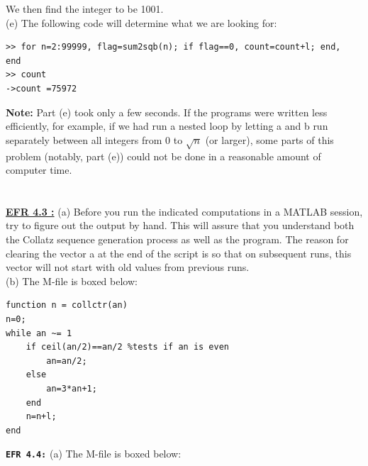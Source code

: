 \documentclass[../main.tex]{subfiles}
\begin{document}
We then find the integer to be 1001. \\
(e) The following code will determine what we are looking for:\\
\begin{lstlisting}[numbers=none,frame=none]
>> for n=2:99999, flag=sum2sqb(n); if flag==0, count=count+l; end, 
end 
>> count 
->count =75972 
\end{lstlisting}
\textbf{Note:} Part (e) took only a few seconds. If the programs were written less efficiently, for example, if 
we had run a nested loop by letting a and b run separately between all integers from 0 to $\sqrt{n}$ (or 
larger), some parts of this problem (notably, part (e)) could not be done in a reasonable amount of 
computer time.
\\
\\
\\
\textbf{\underline{EFR 4.3 :}} (a) Before you run the indicated computations in a MATLAB session, try to figure out the 
output by hand. This will assure that you understand both the Collatz sequence generation process as 
well as the program. The reason for clearing the vector a at the end of the script is so that on 
subsequent runs, this vector will not start with old values from previous runs. \\
(b) The M-file is boxed below:
\begin{lstlisting}[numbers=none]
function n = collctr(an) 
n=0; 
while an ~= 1 
	if ceil(an/2)==an/2 %tests if an is even 
		an=an/2; 
	else 
		an=3*an+1; 
	end 
	n=n+l; 
end 
\end{lstlisting}
\textbf{\texttt{EFR 4.4:}} (a) The M-file is boxed below: 
\end{document}
